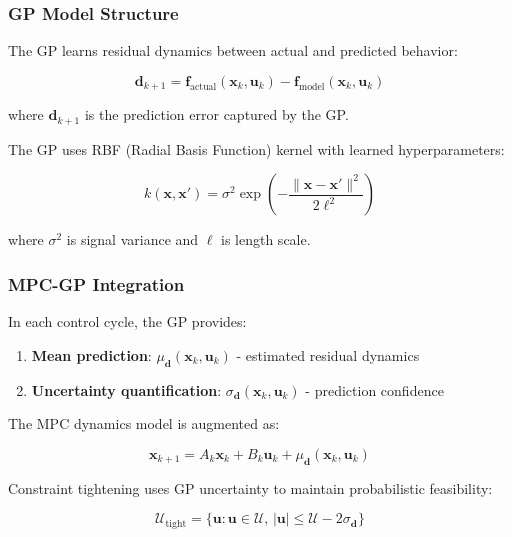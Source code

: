 \documentclass[journal]{IEEEtran}
\begin{document}
\subsubsection{GP Model Structure}

The GP learns residual dynamics between actual and predicted behavior:

\begin{equation}
\mathbf{d}_{k+1} = \mathbf{f}_{\text{actual}}(\mathbf{x}_k, \mathbf{u}_k) - \mathbf{f}_{\text{model}}(\mathbf{x}_k, \mathbf{u}_k)
\label{eq:gp_residual}
\end{equation}

where $\mathbf{d}_{k+1}$ is the prediction error captured by the GP.

The GP uses RBF (Radial Basis Function) kernel with learned hyperparameters:

\begin{equation}
k(\mathbf{x}, \mathbf{x}') = \sigma^2 \exp\left(-\frac{\|\mathbf{x} - \mathbf{x}'\|^2}{2\ell^2}\right)
\label{eq:gp_kernel}
\end{equation}

where $\sigma^2$ is signal variance and $\ell$ is length scale.

\subsubsection{MPC-GP Integration}

In each control cycle, the GP provides:

\begin{enumerate}
    \item \textbf{Mean prediction}: $\mu_{\mathbf{d}}(\mathbf{x}_k, \mathbf{u}_k)$ - estimated residual dynamics
    \item \textbf{Uncertainty quantification}: $\sigma_{\mathbf{d}}(\mathbf{x}_k, \mathbf{u}_k)$ - prediction confidence
\end{enumerate}

The MPC dynamics model is augmented as:

\begin{equation}
\mathbf{x}_{k+1} = A_k \mathbf{x}_k + B_k \mathbf{u}_k + \mu_{\mathbf{d}}(\mathbf{x}_k, \mathbf{u}_k)
\label{eq:gp_mpc_dynamics}
\end{equation}

Constraint tightening uses GP uncertainty to maintain probabilistic feasibility:

\begin{equation}
\mathcal{U}_{\text{tight}} = \{\mathbf{u} : \mathbf{u} \in \mathcal{U}, \, |\mathbf{u}| \leq \mathcal{U} - 2\sigma_{\mathbf{d}}\}
\label{eq:gp_tightening}
\end{equation}
\end{document}
